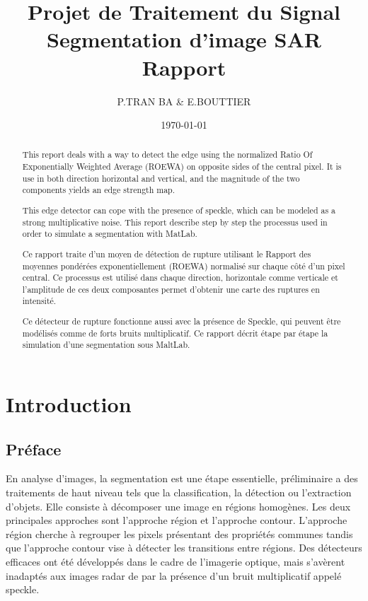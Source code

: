 \documentclass[a4paper,11pt]{article}
\title{Projet de Traitement du Signal\\Segmentation d'image SAR\\Rapport}
\author{P.TRAN BA \& E.BOUTTIER}
\date\today
\begin{document}
\maketitle

\vspace{2cm}

\begin{abstract}

This report deals with a way to detect the edge using the normalized Ratio Of Exponentially Weighted Average (ROEWA) on opposite sides of the central pixel. It is use in both direction horizontal and vertical, and the magnitude of the two components yields an edge strength map.

This edge detector can cope with the presence of speckle, which can be modeled as a strong multiplicative noise. This report describe step by step the processus used in order to simulate a segmentation with MatLab.

\end{abstract}

\vspace{1cm}

\begin{abstract}

Ce rapport traite d'un moyen de détection de rupture utilisant le Rapport des moyennes pondérées exponentiellement (ROEWA) normalisé sur chaque côté d'un pixel central. Ce processus est utilisé dans chaque direction, horizontale comme verticale et l'amplitude de ces deux composantes permet d'obtenir une carte des ruptures en intensité.

Ce détecteur de rupture fonctionne aussi avec la présence de Speckle, qui peuvent être modélisés comme de forts bruits multiplicatif. Ce rapport décrit étape par étape la simulation d'une segmentation sous MaltLab.

\end{abstract}

\newpage

\tableofcontents

\newpage

\section{Introduction}
\subsection{Préface}

En analyse d'images, la segmentation est une étape essentielle, préliminaire a des traitements de haut niveau tels que la classification, la détection ou l'extraction d'objets. Elle consiste à décomposer une image en régions homogènes. Les deux principales approches sont l'approche région et l'approche contour. L'approche région cherche à regrouper les pixels présentant des propriétés communes tandis que l'approche contour vise à détecter les transitions entre régions. Des détecteurs efficaces ont été développés dans le cadre de l'imagerie optique, mais s'avèrent inadaptés aux images radar de par la présence d'un bruit multiplicatif appelé speckle.
\end{document}
